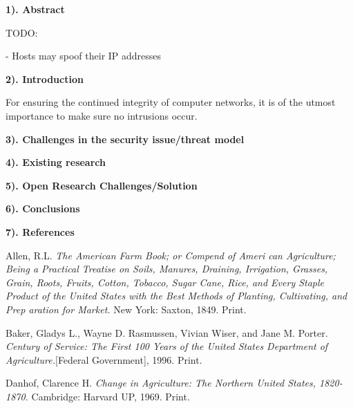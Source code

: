 \documentclass[12pt]{article}
\newcommand{\bibent}{\noindent \hangindent 40pt}
\newenvironment{workscited}{\newpage \textbf{7). References}}{\newpage }
\begin{document}
\begin{flushleft}


\textbf{1). Abstract}

TODO:

- Hosts may spoof their IP addresses

\textbf{2). Introduction}

For ensuring the continued integrity of computer networks, it is of the utmost importance to make sure no intrusions occur. 

\textbf{3). Challenges in the security issue/threat model}

\textbf{4). Existing research}

\textbf{5). Open Research Challenges/Solution}

\textbf{6). Conclusions}

\newpage

\begin{workscited}

\bibent
Allen, R.L. \textit{The American Farm Book; or Compend of Ameri can Agriculture; Being a Practical Treatise on Soils, Manures, Draining, Irrigation, Grasses, Grain, Roots, Fruits, Cotton, Tobacco, Sugar Cane, Rice, and Every Staple Product of the United States with the Best Methods of Planting, Cultivating, and Prep aration for Market.} New York: Saxton, 1849. Print.

\bibent
Baker, Gladys L., Wayne D. Rasmussen, Vivian Wiser, and Jane M. Porter. \textit{Century of Service: The First 100 Years of the United States Department of Agriculture.}[Federal Government], 1996. Print.

\bibent
Danhof, Clarence H. \textit{Change in Agriculture: The Northern United States, 1820-1870.} Cambridge: Harvard UP, 1969. Print.


\end{workscited}

\end{flushleft}
\end{document}
